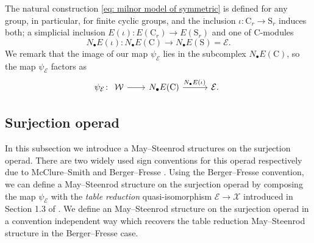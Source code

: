 \begin{remark}
	The natural construction \eqref{eq: milnor model of symmetric} is defined for any group, in particular, for finite cyclic groups, and the inclusion $\iota \colon \mathrm C_r \to \mathrm S_r$ induces both; a simplicial inclusion $E(\iota) \colon E(\mathrm C_r) \to E(\mathrm S_r)$ and one of $\mathrm C$-modules
	\begin{equation*}
	N_\bullet E(\iota) \colon N_\bullet E(\mathrm C) \to N_\bullet E(\mathrm S) = \mathcal E.
	\end{equation*}
	We remark that the image of our map $\psi_{\mathcal E}$ lies in the subcomplex $N_\bullet E(\mathrm C)$, so the map $\psi_{\mathcal E}$ factors as
	\begin{equation*}
	\psi_{\mathcal E} \colon
	\begin{tikzcd}
	\mathcal W \arrow[r] &[-3pt] N_\bullet E(\mathrm C) \arrow[r, "N_\bullet E(\iota)\,"] &[5pt] \mathcal E.
	\end{tikzcd}
	\end{equation*}
\end{remark}

\subsection{Surjection operad}

In this subsection we introduce a May--Steenrod structures on the surjection operad.
There are two widely used sign conventions for this operad respectively due to McClure--Smith \cite{mcclure2003multivariable} and Berger--Fresse \cite{berger2004combinatorial}.
Using the Berger--Fresse convention, we can define a May--Steenrod structure on the surjection operad by composing the map $\psi_{\mathcal E}$ with the \textit{table reduction} quasi-isomorphism $\mathcal E \to \mathcal X$ introduced in Section 1.3 of \cite{berger2004combinatorial}.
We define an May--Steenrod structure on the surjection operad in a convention independent way which recovers the table reduction May--Steenrod structure in the Berger--Fresse case.

